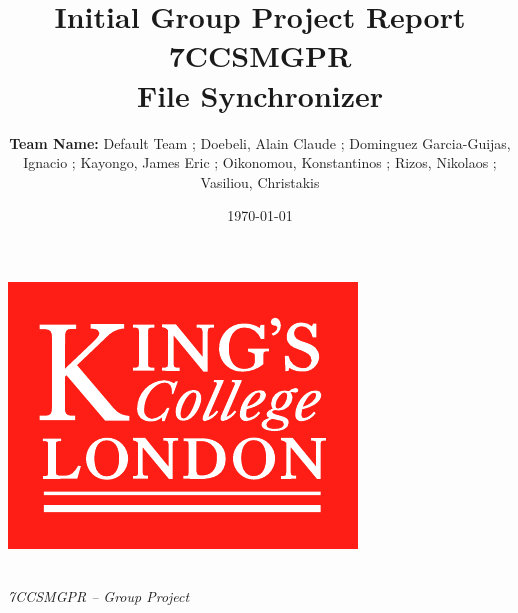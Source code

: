 \documentclass[11pt]{article}
\title{ Initial Group Project Report\\
7CCSMGPR\\[2\baselineskip]
File Synchronizer}
\author{\textbf{Team Name:} Default Team ; Doebeli, Alain Claude ; Dominguez Garcia-Guijas, Ignacio ; Kayongo, James Eric ; 
Oikonomou, Konstantinos ; Rizos, Nikolaos ; Vasiliou, Christakis}
\date{\today}
\begin{document}



\begin{titlepage}
	
	\centering

    \hspace{0pt}
    \vspace*{\fill}
	
	\includegraphics*[scale = 1.0]{graphics/kcl-logo-colour.pdf}
	
	\hspace{0pt}
	\vspace*{\fill}
	
	 \\[8mm]
	\large\emph{7CCSMGPR -- Group Project} \\[5mm]
	

\end{titlepage}
\end{document}
